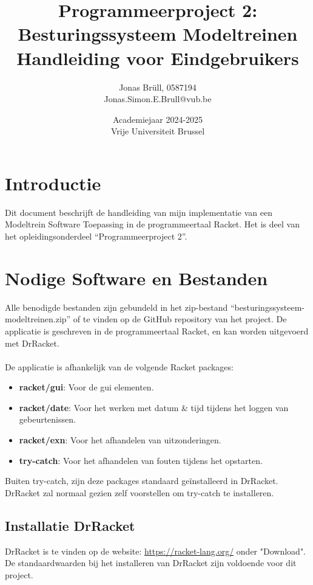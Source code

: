 \documentclass[a4paper, 11pt]{article}
\title{Programmeerproject 2: Besturingssysteem Modeltreinen\\ Handleiding voor Eindgebruikers}
\author{Jonas Br\"ull, 0587194\\ Jonas.Simon.E.Brull@vub.be\\}
\date{Academiejaar 2024-2025\\Vrije Universiteit Brussel}
\newcommand{\<}{\scriptsize\textless\normalsize}
\renewcommand{\>}{\scriptsize\textgreater\normalsize}
\begin{document}
\maketitle
\newpage

\tableofcontents
\newpage

\pagestyle{fancy}
\setcounter{page}{1}

\section{Introductie} %
Dit document beschrijft de handleiding van mijn implementatie van een Modeltrein Software Toepassing in de programmeertaal Racket. Het is deel van het opleidingsonderdeel ``Programmeerproject 2''.


\section{Nodige Software en Bestanden} %
Alle benodigde bestanden zijn gebundeld in het zip-bestand ``besturingssysteem-modeltreinen.zip'' of te vinden op de GitHub repository van het project. De applicatie is geschreven in de programmeertaal Racket, en kan worden uitgevoerd met DrRacket.\\\\
De applicatie is afhankelijk van de volgende Racket packages:
\begin{itemize}
  \item \textbf{racket/gui}:  Voor de gui elementen.
  \item \textbf{racket/date}: Voor het werken met datum \& tijd tijdens het loggen van gebeurtenissen. 
  \item \textbf{racket/exn}:  Voor het afhandelen van uitzonderingen.
  \item \textbf{try-catch}:   Voor het afhandelen van fouten tijdens het opstarten. 
\end{itemize}
Buiten try-catch, zijn deze packages standaard geïnstalleerd in DrRacket. DrRacket zal normaal gezien zelf voorstellen om try-catch te installeren.

\subsection{Installatie DrRacket} %
DrRacket is te vinden op de website: \url{https://racket-lang.org/} onder "Download". De standaardwaarden bij het installeren van DrRacket zijn voldoende voor dit project.
\end{document}
